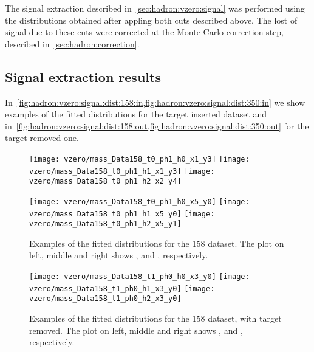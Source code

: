The signal extraction described in~\cref{sec:hadron:vzero:signal}
was performed using the \minv distributions obtained
after appling both \vzero cuts described above.
The lost of signal \vzeros due to these cuts were corrected
at the Monte Carlo correction step, described in~\cref{sec:hadron:correction}.

\subsection{Signal extraction results}
\label{sec:hadron:vzero:results}


In~\cref{fig:hadron:vzero:signal:dist:158:in,fig:hadron:vzero:signal:dist:350:in}
we show examples of the fitted \minv distributions
for the target inserted dataset and
in~\cref{fig:hadron:vzero:signal:dist:158:out,fig:hadron:vzero:signal:dist:350:out}
for the target removed one.


\begin{figure}[!ht]
  \centering
  \texttt{[image: vzero/mass\_Data158\_t0\_ph1\_h0\_x1\_y3]}
  \texttt{[image: vzero/mass\_Data158\_t0\_ph1\_h1\_x1\_y3]}
  \texttt{[image: vzero/mass\_Data158\_t0\_ph1\_h2\_x2\_y4]}

  \vspace{0.5cm}
    
  \texttt{[image: vzero/mass\_Data158\_t0\_ph1\_h0\_x5\_y0]}
  \texttt{[image: vzero/mass\_Data158\_t0\_ph1\_h1\_x5\_y0]}
  \texttt{[image: vzero/mass\_Data158\_t0\_ph1\_h2\_x5\_y1]}
  
  \caption{Examples of the fitted \minv distributions for the 158 \GeVc dataset. The plot on left, middle and right shows \lamb, \antilamb and \kzeros, respectively.}
  \label{fig:hadron:vzero:signal:dist:158:in}
\end{figure}


\begin{figure}[!ht]
  \centering
  \texttt{[image: vzero/mass\_Data158\_t1\_ph0\_h0\_x3\_y0]}
  \texttt{[image: vzero/mass\_Data158\_t1\_ph0\_h1\_x3\_y0]}
  \texttt{[image: vzero/mass\_Data158\_t1\_ph0\_h2\_x3\_y0]}
  
  \caption{Examples of the fitted \minv distributions for the 158 \GeVc dataset, with target removed. The plot on left, middle and right shows \lamb, \antilamb and \kzeros, respectively.}
  \label{fig:hadron:vzero:signal:dist:158:out}
\end{figure}

